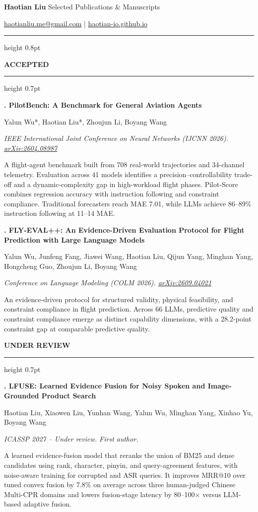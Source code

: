 \documentclass[10pt,a4paper]{article}
\newcommand{\pubsection}[1]{%
  \vspace{10pt}%
  {\sffamily\bfseries\fontsize{12.5}{15.2}\selectfont
    \color{navy}\MakeUppercase{#1}}\par
  \vspace{2pt}%
  {\color{rule}\hrule height 0.7pt}\vspace{7pt}%
}
\newcommand{\pubentry}[5]{%
  {\sffamily\bfseries\fontsize{11.7}{14.2}\selectfont #1}\par
  {\fontsize{10.5}{13.6}\selectfont #2}\par
  {\fontsize{10.4}{13.6}\selectfont\itshape #3}\par
  {\fontsize{10.35}{13.5}\selectfont #4}\par
  {\fontsize{10.6}{15.0}\selectfont #5}\par
  \vspace{8pt}%
}
\begin{document}
\color{text}

{\sffamily\bfseries\fontsize{24.5}{28}\selectfont\color{navy}Haotian Liu}
\hfill
{\fontsize{11.2}{13.5}\selectfont Selected Publications \& Manuscripts}\par

\vspace{4.5pt}
{\fontsize{10.2}{12.8}\selectfont
  \href{mailto:haotianliu.me@gmail.com}{haotianliu.me@gmail.com}
  \enspace\textcolor{muted}{|}\enspace
  \href{https://haotian-io.github.io/}{haotian-io.github.io}}
\par\vspace{5pt}
{\color{rule}\hrule height 0.8pt}

\pubsection{Accepted}

\pubentry
  {1. PilotBench: A Benchmark for General Aviation Agents}
  {Yalun Wu*, Haotian Liu*, Zhoujun Li, Boyang Wang}
  {IEEE International Joint Conference on Neural Networks (IJCNN 2026).\enspace
   \href{https://arxiv.org/abs/2604.08987}{arXiv:2604.08987}}
  {}
  {A flight-agent benchmark built from 708 real-world trajectories and
   34-channel telemetry. Evaluation across 41 models identifies a
   precision--controllability trade-off and a dynamic-complexity gap in
   high-workload flight phases. Pilot-Score combines regression accuracy
   with instruction following and constraint compliance. Traditional
   forecasters reach MAE 7.01, while LLMs achieve 86--89\% instruction
   following at 11--14 MAE.}

\pubentry
  {2. FLY-EVAL++: An Evidence-Driven Evaluation Protocol for Flight Prediction with Large Language Models}
  {Yalun Wu, Junfeng Fang, Jiawei Wang, Haotian Liu, Qijun Yang, Minghan Yang,
   Hongcheng Guo, Zhoujun Li, Boyang Wang}
  {Conference on Language Modeling (COLM 2026).\enspace
   \href{https://arxiv.org/abs/2609.04021}{arXiv:2609.04021}}
  {}
  {An evidence-driven protocol for structured validity, physical feasibility,
   and constraint compliance in flight prediction. Across 66 LLMs, predictive
   quality and constraint compliance emerge as distinct capability dimensions,
   with a 28.2-point constraint gap at comparable predictive quality.}

\pubsection{Under Review}

\pubentry
  {3. LFUSE: Learned Evidence Fusion for Noisy Spoken and Image-Grounded Product Search}
  {Haotian Liu, Xiaowen Liu, Yunhan Wang, Yalun Wu, Minghan Yang,
   Xinhao Yu, Boyang Wang}
  {ICASSP 2027 -- Under review. First author.}
  {}
  {A learned evidence-fusion model that reranks the union of BM25 and dense
   candidates using rank, character, pinyin, and query-agreement features,
   with noise-aware training for corrupted and ASR queries. It improves
   MRR@10 over tuned convex fusion by 7.8\% on average across three
   human-judged Chinese Multi-CPR domains and lowers fusion-stage latency by
   80--100$\times$ versus LLM-based adaptive fusion.}
\end{document}
